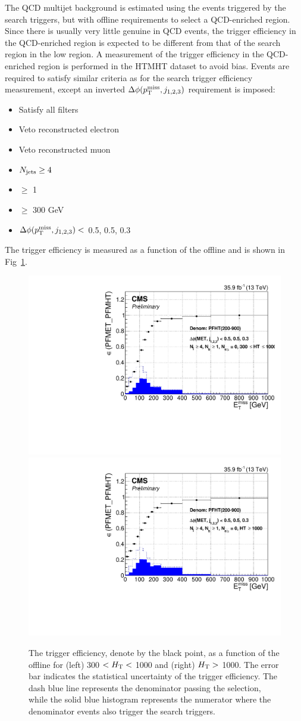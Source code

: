 The QCD multijet background is estimated using the events triggered by the search triggers, but with offline requirements to select a QCD-enriched region. Since there is usually very little genuine \MET in QCD events, the \MET trigger efficiency in the QCD-enriched region is expected to be different from that of the search region in the low \MET region. A measurement of the trigger efficiency in the QCD-enriched region is performed in the HTMHT dataset to avoid bias. Events are required to satisfy similar criteria as for the search trigger efficiency measurement, except an inverted $\Delta\phi(p^{\rm miss}_{\rm T}, j_{1,2,3})$ requirement is imposed:
\begin{itemize}
  \item Satisfy all filters
  \item Veto reconstructed electron
  \item Veto reconstructed muon
  \item $N_{\text{jets}}\geq4$
  \item \nbjets $\ge$ 1
  \item \HT $\ge$ 300 GeV
  \item $\Delta\phi(p^{\rm miss}_{\rm T}, j_{1,2,3})<$ 0.5, 0.5, 0.3
\end{itemize}
The trigger efficiency is measured as a function of the offline \MET and is shown in Fig~\ref{fig:TrigMETQCD}.
\begin{figure}[tbp]
 \begin{center}
   \includegraphics[width=0.49\linewidth]{sections/mc4/EvtSelSBOpt/figures/TrigHT_QCD_TrigMET_HTLess1000_9.pdf}
   \includegraphics[width=0.49\linewidth]{sections/mc4/EvtSelSBOpt/figures/TrigHT_QCD_TrigMET_HTMore1000_9.pdf}
   \caption{ The trigger efficiency, denote by the black point, as a function
   of the offline \MET for (left) 300 $< H_{\mathrm{T}} <$ 1000 and (right) $H_{\mathrm{T}} >$ 1000.
   The error bar indicates the statistical uncertainty of the trigger
   efficiency. The dash blue line represents the denominator passing the
   selection, while the solid blue histogram represents the numerator where
   the denominator events also trigger the search triggers. }
   \label{fig:TrigMETQCD}
 \end{center}
\end{figure}

